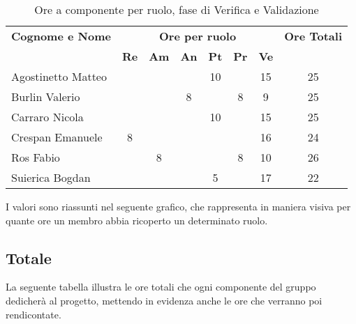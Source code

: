 \begin{table}[h]
	\centering
	\begin{tabular}{|l|c|c|c|c|c|c|c|}
		\toprule
		\textbf{Cognome e Nome} & \multicolumn{6}{c}{\textbf{Ore per ruolo}} & \textbf{Ore Totali} \\
		& \textbf{Re} & \textbf{Am} & \textbf{An} & \textbf{Pt} & \textbf{Pr} & \textbf{Ve} & \\
		
		\midrule
		Agostinetto Matteo & & & & 10 & & 15 & 25 \\
		Burlin Valerio & & & 8 & & 8 & 9 & 25 \\ 
		Carraro Nicola & & & & 10 & & 15 & 25 \\
		Crespan Emanuele & 8 & & & & & 16 & 24 \\
		Ros Fabio & & 8 & & & 8 & 10 & 26 \\
		Suierica Bogdan & & & & 5 & & 17 & 22 \\
		
		\bottomrule
	\end{tabular}
	\caption{Ore a componente per ruolo, fase di Verifica e Validazione}
\end{table}

I valori sono riassunti nel seguente grafico, che rappresenta in maniera visiva per quante ore un membro abbia ricoperto un determinato ruolo.

\subsection{Totale}
La seguente tabella illustra le ore totali che ogni componente del gruppo dedicherà al progetto, mettendo in evidenza anche le ore che verranno poi rendicontate.

